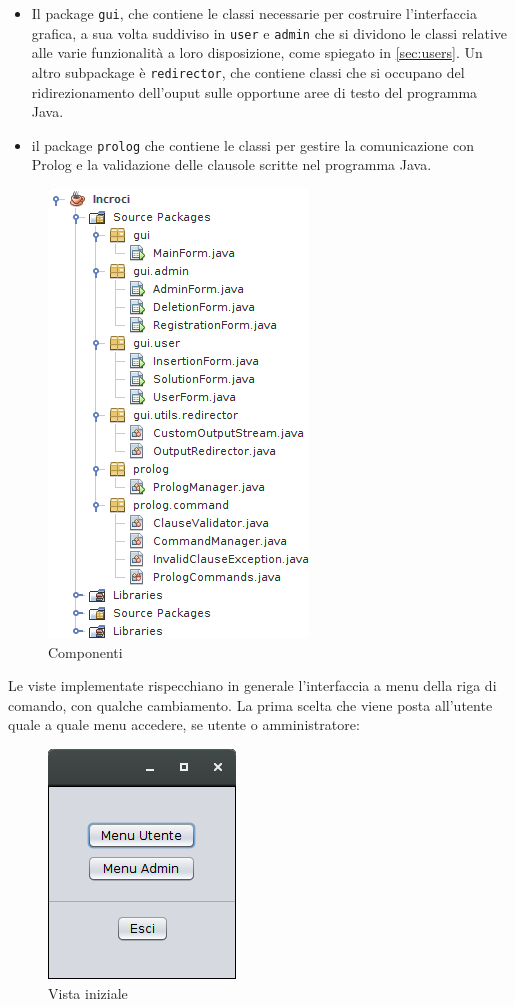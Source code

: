 \begin{itemize}
	\item Il package \texttt{gui}, che contiene le classi necessarie per costruire l'interfaccia grafica, a sua volta suddiviso in \texttt{user} e \texttt{admin} che si dividono le classi relative alle varie funzionalità a loro disposizione, come spiegato in \ref{sec:users}. Un altro subpackage è \texttt{redirector}, che contiene classi che si occupano del ridirezionamento dell'ouput sulle opportune aree di testo del programma Java.
	\item il package \texttt{prolog} che contiene le classi per gestire la comunicazione con Prolog e la validazione delle clausole scritte nel programma Java.
\end{itemize}

\begin{figure}[!htbp]
	\centering
	\includegraphics[width=.4\textwidth]{images/java}
	\caption{Componenti}
\end{figure}

\clearpage
Le viste implementate rispecchiano in generale l'interfaccia a menu della riga di comando, con qualche cambiamento. La prima scelta che viene posta all'utente quale a quale menu accedere, se utente o amministratore:

\begin{figure}[!htbp]
	\centering
	\includegraphics[width=.3\textwidth]{images/menu_gui}
	\caption{Vista iniziale}
\end{figure}

